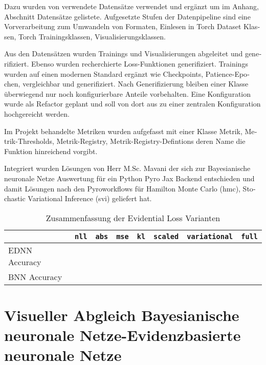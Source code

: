 \begin{otherlanguage}{ngerman}
Dazu wurden von \parencite{Depeweg2019} verwendete Datensätze verwendet und ergänzt um im Anhang, Abschnitt Datensätze gelistete. Aufgesetzte Stufen der Datenpipeline sind eine Vorverarbeitung zum Umwandeln von Formaten, Einlesen in Torch Dataset Klassen, Torch Trainingsklassen, Visualisierungsklassen.\newline

Aus den Datensätzen wurden Trainings und Visualisierungen abgeleitet und generifiziert. Ebenso wurden recherchierte Loss-Funktionen generifiziert. Trainings wurden auf einen modernen Standard ergänzt wie Checkpoints, Patience-Epochen, vergleichbar und generifiziert. Nach Generifizierung bleiben einer Klasse überwiegend nur noch konfigurierbare Anteile vorbehalten. Eine Konfiguration wurde als Refactor geplant und soll von dort aus zu einer zentralen Konfiguration hochgereicht werden.\newline

Im Projekt behandelte Metriken wurden aufgefasst mit einer Klasse Metrik, Metrik-Thresholds, Metrik-Registry, Metrik-Registry-Defintions deren Name die Funktion hinreichend vorgibt.\newline

Integriert wurden Lösungen von Herr M.Sc. Mavani der sich zur \gls{Bayesianische neuronale Netze} Auswertung für ein Python Pyro Jax Backend entschieden und damit Lösungen nach den Pyroworkflows für Hamilton Monte Carlo (\gls{hmc}), Stochastic Variational Inference (\gls{svi}) geliefert hat.



\begin{table}[htbp]
\centering
\begin{tabularx}{\textwidth}{|l|l|l|l|l|l|l|X|}
\hline
 & \texttt{nll} & \texttt{abs} & \texttt{mse} & \texttt{kl} & \texttt{scaled} & \texttt{variational} & \texttt{full} \\
\hline
EDNN Accuracy & & & & & & & \\
\hline
BNN Accuracy & & & & & & & \\
\hline
\end{tabularx}
\caption{Zusammenfassung der Evidential Loss Varianten}
\end{table}



\section*{Visueller Abgleich \gls{Bayesianische neuronale Netze}-\gls{Evidenzbasierte neuronale Netze}}


\end{otherlanguage}
